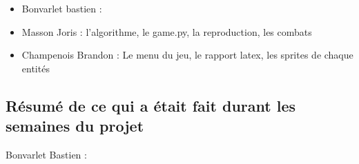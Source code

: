\documentclass[a4paper, 11pt]{article}
\begin{document}
\begin{itemize}
\item Bonvarlet bastien :\\
\item Masson Joris : l'algorithme, le game.py, la reproduction, les combats\\
\item Champenois Brandon : Le menu du jeu, le rapport latex, les sprites de chaque entités
\end{itemize}

\subsection{Résumé de ce qui a était fait durant les semaines du projet}

Bonvarlet Bastien :\\
\end{document}
